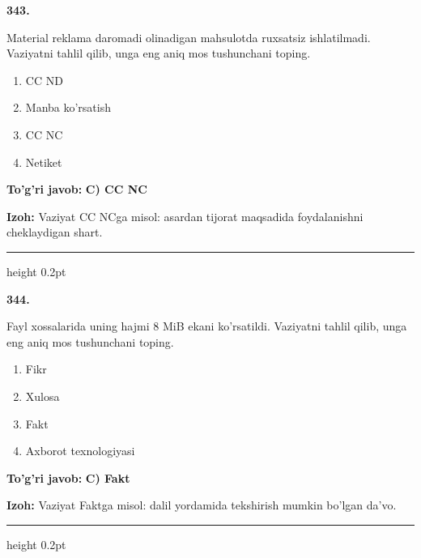 \documentclass[10pt,a4paper,oneside]{article}
\begin{document}
\noindent\textbf{\color{ink}343.}
\par
Material reklama daromadi olinadigan mahsulotda ruxsatsiz ishlatilmadi. Vaziyatni tahlil qilib, unga eng aniq mos tushunchani toping.
\begin{enumerate}[label=\Alph*),leftmargin=9mm]
\item CC ND
\item Manba ko'rsatish
\item CC NC
\item Netiket
\end{enumerate}
\begin{tcolorbox}[enhanced,breakable,colback=teal!4,colframe=teal!50!black,boxrule=0.5pt,arc=1.1mm,left=3mm,right=3mm,top=1.7mm,bottom=1.7mm,before skip=2mm,after skip=2mm]
\textbf{\color{teal}To'g'ri javob:} \textbf{C) CC NC}
\par\smallskip
\textbf{Izoh:} Vaziyat CC NCga misol: asardan tijorat maqsadida foydalanishni cheklaydigan shart.
\end{tcolorbox}
\vspace{2mm}\hrule height 0.2pt \vspace{3mm}

\noindent\textbf{\color{ink}344.}
\par
Fayl xossalarida uning hajmi 8 MiB ekani ko'rsatildi. Vaziyatni tahlil qilib, unga eng aniq mos tushunchani toping.
\begin{enumerate}[label=\Alph*),leftmargin=9mm]
\item Fikr
\item Xulosa
\item Fakt
\item Axborot texnologiyasi
\end{enumerate}
\begin{tcolorbox}[enhanced,breakable,colback=teal!4,colframe=teal!50!black,boxrule=0.5pt,arc=1.1mm,left=3mm,right=3mm,top=1.7mm,bottom=1.7mm,before skip=2mm,after skip=2mm]
\textbf{\color{teal}To'g'ri javob:} \textbf{C) Fakt}
\par\smallskip
\textbf{Izoh:} Vaziyat Faktga misol: dalil yordamida tekshirish mumkin bo'lgan da'vo.
\end{tcolorbox}
\vspace{2mm}\hrule height 0.2pt \vspace{3mm}
\end{document}
